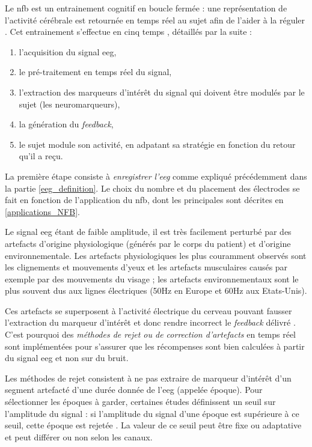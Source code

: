 Le \gls{nfb} est un entrainement cognitif en boucle fermée : une représentation de l'activité cérébrale est retournée en temps réel
au sujet afin de l'aider à la réguler \citep{Enriquez2017}. Cet entrainement s'effectue en cinq temps \citep{Enriquez2017}, détaillés
par la suite :
\begin{enumerate}
\item l'acquisition du signal \gls{eeg}, 
\item le pré-traitement en temps réel du signal,
\item l'extraction des marqueurs d'intérêt du signal qui doivent être modulés par le sujet (les neuromarqueurs),
\item la génération du \textit{feedback},
\item le sujet module son activité, en adpatant sa stratégie en fonction du retour qu'il a reçu. 
\end{enumerate}

La première étape consiste à \emph{enregistrer l'\gls{eeg} }comme expliqué précédemment dans la partie \ref{eeg_definition}. Le choix
du nombre et du placement des électrodes se fait en fonction de l'application du \gls{nfb}, dont les principales sont décrites en
\ref{applications_NFB}. 

Le signal \gls{eeg} étant de faible amplitude, il est très facilement perturbé par des artefacts d'origine physiologique (générés par le
corps du patient) et d'origine environnementale. Les artefacts physiologiques les plus couramment observés sont les clignements et mouvements
d'yeux \citep{Iwasaki2005} et les artefacts musculaires causés par exemple par des mouvements du visage ; les artefacts environnementaux sont le plus souvent 
dus aux lignes électriques (50Hz en Europe et 60Hz aux Etats-Unis). 

Ces artefacts se superposent à l'activité électrique du cerveau pouvant fausser l'extraction du marqueur d'intérêt et donc rendre
incorrect le \textit{feedback} délivré \citep{Enriquez2017}. C'est pourquoi des \emph{méthodes de rejet ou de correction d'artefacts} en temps 
réel sont implémentées pour s'assurer que les récompenses sont bien calculées à partir du signal \gls{eeg} et non sur du bruit. 

Les méthodes de rejet consistent à ne pas extraire de marqueur d'intérêt d'un segment artefacté d'une durée donnée de l'\gls{eeg} (appelée époque). Pour sélectionner
les époques à garder, certaines études définissent un seuil sur l'amplitude du signal : si l'amplitude du signal d'une époque est supérieure
à ce seuil, cette époque est rejetée \citep{Gevensleben2009, Heinrich2004}. La valeur de ce seuil peut être fixe ou adaptative et peut 
différer ou non selon les canaux. 

